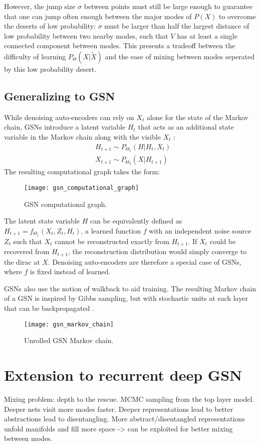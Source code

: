 However, the jump size \(\sigma\) between points must still be large enough to guarantee that one can jump often enough between the major modes of \(P(X)\) to overcome the deserts of low probability: \(\sigma\) must be larger than half the largest distance of low probability between two nearby modes, such that \(V\) has at least a single connected component between modes. This presents a tradeoff between the difficulty of learning \(P_{\Theta}(X|\widetilde{X})\) and the ease of mixing between modes seperated by this low probability desert.


\subsection{Generalizing to GSN}

While denoising auto-encoders can rely on \(X_t\) alone for the state of the Markov chain, GSNs introduce a latent variable \(H_t\) that acts as an additional state variable in the Markov chain along with the visible \(X_t\) \cite{gsn}:
\begin{align*}
 &H_{t+1} \sim P_{\Theta_1}(H|H_t, X_t)\\
 &X_{t+1} \sim  P_{\Theta_2}(X|H_{t+1})
\end{align*}
The resulting computational graph takes the form:

\begin{figure}[h!]
  \centering
    \texttt{[image: gsn\_computational\_graph]}
\caption{GSN computational graph.}
\end{figure}
The latent state variable \(H\) can be equivalently defined as \(H_{t+1} = f_{\Theta_1}(X_t,Z_t,H_t)\), a learned function \(f\) with an independent noise source \(Z_t\) such that \(X_t\) cannot be reconstructed exactly from \(H_{t+1}\). If \(X_t\) could be recovered from \(H_{t+1}\), the reconstruction distribution would simply converge to the dirac at \(X\). Denoising auto-encoders are therefore a special case of GSNs, where \(f\) is fixed instead of learned.

GSNs also use the notion of walkback to aid training. The resulting Markov chain of a GSN is inspired by Gibbs sampling, but with stochastic units at each layer that can be backpropagated \cite{rezende14}.

\begin{figure}[h!]
  \centering
    \texttt{[image: gsn\_markov\_chain]}
\caption{Unrolled GSN Markov chain.}
\end{figure}



\section{Extension to recurrent deep GSN}

Mixing problem: depth to the rescue. MCMC sampling from the top layer model. Deeper nets visit more modes faster. Deeper representations lead to better abstractions lead to disentangling. More abstract/disentangled representations unfold manifolds and fill more space -> can be exploited for better mixing between modes.





